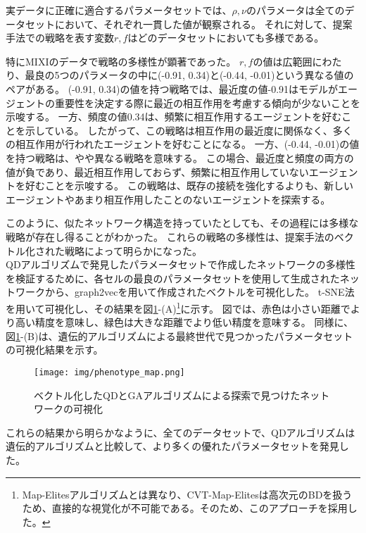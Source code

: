 \documentclass[uplatex,11pt,openany]{ujreport}
\begin{document}
            実データに正確に適合するパラメータセットでは、$\rho, \nu$のパラメータは全てのデータセットにおいて、それぞれ一貫した値が観察される。
            それに対して、提案手法での戦略を表す変数$r, f$はどのデータセットにおいても多様である。

            特にMIXIのデータで戦略の多様性が顕著であった。
            $r, f$の値は広範囲にわたり、最良の5つのパラメータの中に(-0.91, 0.34)と(-0.44, -0.01)という異なる値のペアがある。
            (-0.91, 0.34)の値を持つ戦略では、最近度の値-0.91はモデルがエージェントの重要性を決定する際に最近の相互作用を考慮する傾向が少ないことを示唆する。
            一方、頻度の値0.34は、頻繁に相互作用するエージェントを好むことを示している。
            したがって、この戦略は相互作用の最近度に関係なく、多くの相互作用が行われたエージェントを好むことになる。
            一方、(-0.44, -0.01)の値を持つ戦略は、やや異なる戦略を意味する。
            この場合、最近度と頻度の両方の値が負であり、最近相互作用しておらず、頻繁に相互作用していないエージェントを好むことを示唆する。
            この戦略は、既存の接続を強化するよりも、新しいエージェントやあまり相互作用したことのないエージェントを探索する。

            このように、似たネットワーク構造を持っていたとしても、その過程には多様な戦略が存在し得ることがわかった。
            これらの戦略の多様性は、提案手法のベクトル化された戦略によって明らかになった。
            \\

            QDアルゴリズムで発見したパラメータセットで作成したネットワークの多様性を検証するために、各セルの最良のパラメータセットを使用して生成されたネットワークから、graph2vecを用いて作成されたベクトルを可視化した。
            t-SNE法\cite{vandermaatenVisualizingDataUsing2008}を用いて可視化し、その結果を図\ref{fig:phenotype_map}-(A)\footnote{Map-Elitesアルゴリズムとは異なり、CVT-Map-Elitesは高次元のBDを扱うため、直接的な視覚化が不可能である。そのため、このアプローチを採用した。}に示す。
            図では、赤色は小さい距離でより高い精度を意味し、緑色は大きな距離でより低い精度を意味する。
            同様に、図\ref{fig:phenotype_map}-(B)は、遺伝的アルゴリズムによる最終世代で見つかったパラメータセットの可視化結果を示す。
            \begin{figure}[H]
                \centering
                \texttt{[image: img/phenotype\_map.png]}
                \caption{ベクトル化したQDとGAアルゴリズムによる探索で見つけたネットワークの可視化}
                \label{fig:phenotype_map}
            \end{figure}
            これらの結果から明らかなように、全てのデータセットで、QDアルゴリズムは遺伝的アルゴリズムと比較して、より多くの優れたパラメータセットを発見した。
\end{document}
